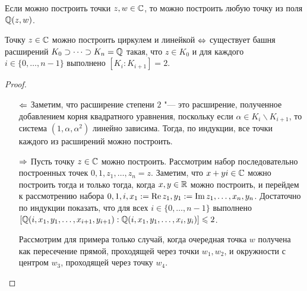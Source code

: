 \begin{corollary}
	Если можно построить точки $z, w \in \mathbb{C}$, то можно построить любую точку из поля $\mathbb{Q}(z, w)$.
\end{corollary}

\begin{theorem}
	Точку $z \in \mathbb{C}$ можно построить циркулем и линейкой $\Leftrightarrow$ существует башня расширений $K_0 \supset \dotsb \supset K_n = \mathbb{Q}$ такая, что $z \in K_0$ и для каждого $i \in \{0, \dotsc, n - 1\}$ выполнено $[K_i : K_{i + 1}] = 2$.
\end{theorem}

\begin{proof}~
	\begin{itemize}
		\item[$\Leftarrow$] Заметим, что расширение степени $2$ "--- это расширение, полученное добавлением корня квадратного уравнения, поскольку если $\alpha \in K_i \backslash K_{i + 1}$, то система $(1, \alpha, \alpha^2)$ линейно зависима. Тогда, по индукции, все точки каждого из расширений можно построить.
		\item[$\Rightarrow$] Пусть точку $z \in \mathbb{C}$ можно построить. Рассмотрим набор последовательно построенных точек $0, 1, z_1, \dotsc, z_n = z$. Заметим, что $x + yi \in \mathbb{C}$ можно построить тогда и только тогда, когда $x, y \in \mathbb{R}$ можно построить, и перейдем к рассмотрению набора $0, 1, i, x_1 := \operatorname{Re}{z_1}, y_1 := \operatorname{Im}{z_1}, \dotsc, x_n, y_n$. Достаточно по индукции показать, что для всех $i \in \{0, \dotsc, n - 1\}$ выполнено $[\mathbb{Q}(i, x_1, y_1, \dotsc, x_{i + 1}, y_{i + 1}) : \mathbb{Q}(i, x_1, y_1, \dotsc, x_{i}, y_{i})] \leqslant 2$.
		
		Рассмотрим для примера только случай, когда очередная точка $w$ получена как пересечение прямой, проходящей через точки $w_1, w_2$, и окружности с центром $w_3$, проходящей через точку $w_4$.
		\begin{center}
\end{center}
\end{itemize}
\end{proof}

